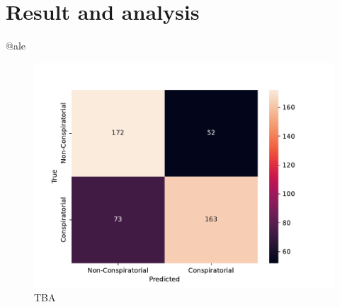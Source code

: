 \documentclass[11pt]{article}
\begin{document}
\section{Result and analysis}\label{sec:results-analysis}
@ale
\begin{figure}
  \centering
  \includegraphics[width=\columnwidth]{figures/decoder-only-confusion-matrix.pdf}
  \caption{
   TBA}
  \label{fig:decoder-only-cm}
\end{figure}


\nocite{*}





\end{document}
